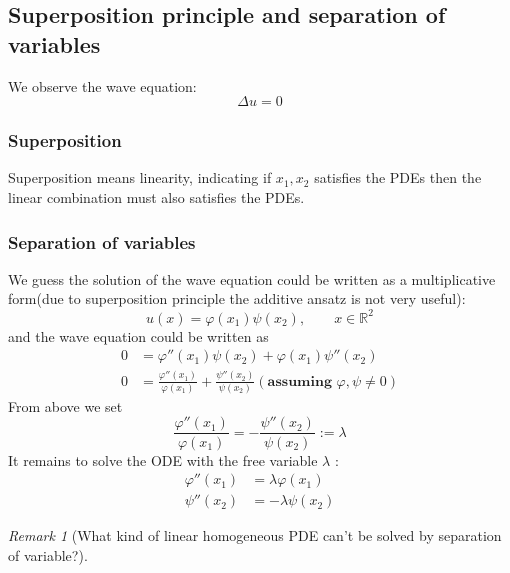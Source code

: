 \documentclass[a4paper,11pt,oneside,fleqn]{book}
\theoremstyle{definition}
\theoremstyle{remark}
\newtheorem*{remark}{Remark}
\begin{document}
\subsection{Superposition principle and separation of variables}
We observe the wave equation:
\begin{equation*}
	\Delta u = 0
\end{equation*}
\subsubsection*{Superposition}
Superposition means linearity, indicating if $x_1, x_2$ satisfies the PDEs then the linear combination must also satisfies the PDEs. 

\subsubsection*{Separation of variables}
We guess the solution of the wave equation could be written as a multiplicative form(due to superposition principle the additive ansatz is not very useful):
\begin{equation*}
	u(x) = \varphi(x_1)\psi(x_2), \qquad x \in \mathbb{R}^2
\end{equation*}
and the wave equation could be written as 
\begin{align*}
	0 &= \varphi''(x_1)\psi(x_2) + \varphi(x_1)\psi''(x_2)\\
	0 &= \frac{\varphi''(x_1)}{\varphi(x_1)} + \frac{\psi''(x_2)}{\psi(x_2)}(\textbf{assuming } \varphi, \psi \neq 0)
\end{align*}
From above we set 
\begin{equation*}
	\frac{\varphi''(x_1)}{\varphi(x_1)} = - \frac{\psi''(x_2)}{\psi(x_2)}:= \lambda
\end{equation*}
It remains to solve the ODE with the free variable $\lambda$ :
\begin{align*}
	\varphi''(x_1) &= \lambda \varphi(x_1)\\
	\psi''(x_2) &= -\lambda \psi(x_2)
\end{align*}

\begin{remark}[What kind of linear homogeneous PDE can't be solved by separation of variable?]
\end{remark}
\end{document}
